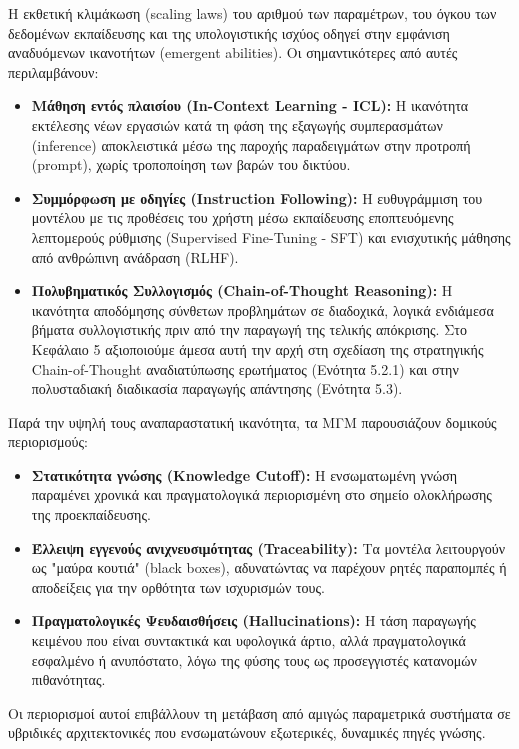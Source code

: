 Η εκθετική κλιμάκωση (scaling laws) του αριθμού των παραμέτρων, του όγκου των δεδομένων εκπαίδευσης και της υπολογιστικής ισχύος οδηγεί στην εμφάνιση αναδυόμενων ικανοτήτων (emergent abilities). Οι σημαντικότερες από αυτές περιλαμβάνουν:
\begin{itemize}
    \item \textbf{Μάθηση εντός πλαισίου (In-Context Learning - ICL):} Η ικανότητα εκτέλεσης νέων εργασιών κατά τη φάση της εξαγωγής συμπερασμάτων (inference) αποκλειστικά μέσω της παροχής παραδειγμάτων στην προτροπή (prompt), χωρίς τροποποίηση των βαρών του δικτύου.
    \item \textbf{Συμμόρφωση με οδηγίες (Instruction Following):} Η ευθυγράμμιση του μοντέλου με τις προθέσεις του χρήστη μέσω εκπαίδευσης εποπτευόμενης λεπτομερούς ρύθμισης (Supervised Fine-Tuning - SFT) και ενισχυτικής μάθησης από ανθρώπινη ανάδραση (RLHF).
    \item \textbf{Πολυβηματικός Συλλογισμός (Chain-of-Thought Reasoning):} Η ικανότητα αποδόμησης σύνθετων προβλημάτων σε διαδοχικά, λογικά ενδιάμεσα βήματα συλλογιστικής πριν από την παραγωγή της τελικής απόκρισης. Στο Κεφάλαιο 5 αξιοποιούμε άμεσα αυτή την αρχή στη σχεδίαση της στρατηγικής Chain-of-Thought αναδιατύπωσης ερωτήματος (Ενότητα 5.2.1) και στην πολυσταδιακή διαδικασία παραγωγής απάντησης (Ενότητα 5.3).
\end{itemize}

Παρά την υψηλή τους αναπαραστατική ικανότητα, τα ΜΓΜ παρουσιάζουν δομικούς περιορισμούς:
\begin{itemize}
    \item \textbf{Στατικότητα γνώσης (Knowledge Cutoff):} Η ενσωματωμένη γνώση παραμένει χρονικά και πραγματολογικά περιορισμένη στο σημείο ολοκλήρωσης της προεκπαίδευσης.
    \item \textbf{Έλλειψη εγγενούς ανιχνευσιμότητας (Traceability):} Τα μοντέλα λειτουργούν ως "μαύρα κουτιά" (black boxes), αδυνατώντας να παρέχουν ρητές παραπομπές ή αποδείξεις για την ορθότητα των ισχυρισμών τους.
    \item \textbf{Πραγματολογικές Ψευδαισθήσεις (Hallucinations):} Η τάση παραγωγής κειμένου που είναι συντακτικά και υφολογικά άρτιο, αλλά πραγματολογικά εσφαλμένο ή ανυπόστατο, λόγω της φύσης τους ως προσεγγιστές κατανομών πιθανότητας.
\end{itemize}

Οι περιορισμοί αυτοί επιβάλλουν τη μετάβαση από αμιγώς παραμετρικά συστήματα σε υβριδικές αρχιτεκτονικές που ενσωματώνουν εξωτερικές, δυναμικές πηγές γνώσης.

